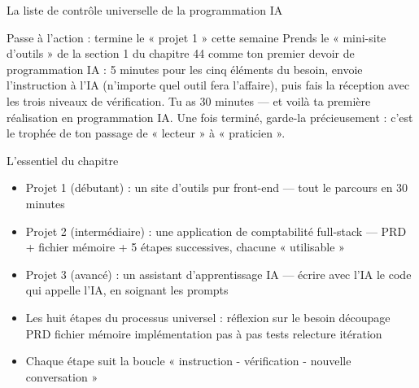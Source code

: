 \begin{center}\small\color{gray}La liste de contrôle universelle de la programmation IA\end{center}

\begin{tcbpractice}{Passe à l'action : termine le « projet 1 » cette semaine}
Prends le « mini-site d'outils » de la section 1 du chapitre 44 comme ton premier devoir de programmation IA : 5 minutes pour les cinq éléments du besoin, envoie l'instruction à l'IA (n'importe quel outil fera l'affaire), puis fais la réception avec les trois niveaux de vérification. Tu as 30 minutes — et voilà ta première réalisation en programmation IA. Une fois terminé, garde-la précieusement : c'est le trophée de ton passage de « lecteur » à « praticien ».

\end{tcbpractice}

\begin{tcbsummary}{L'essentiel du chapitre}
\begin{itemize}
  \item Projet 1 (débutant) : un site d'outils pur front-end — tout le parcours en 30 minutes
  \item Projet 2 (intermédiaire) : une application de comptabilité full-stack — PRD + fichier mémoire + 5 étapes successives, chacune « utilisable »
  \item Projet 3 (avancé) : un assistant d'apprentissage IA — écrire avec l'IA le code qui appelle l'IA, en soignant les prompts
  \item Les huit étapes du processus universel : réflexion sur le besoin découpage PRD fichier mémoire implémentation pas à pas tests relecture itération
  \item Chaque étape suit la boucle « instruction - vérification - nouvelle conversation »
\end{itemize}

\end{tcbsummary}

